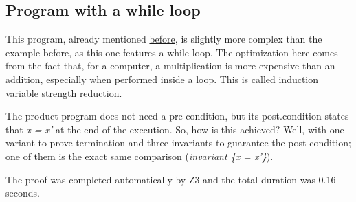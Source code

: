 \FloatBarrier
\subsection{Program with a while loop}
\label{sub:results_while}

This program, already mentioned \hyperref[fig:induction_var_strength_red]{before}, is slightly more complex than the example before, as this one features a while loop.
The optimization here comes from the fact that, for a computer, a multiplication is more expensive than an addition, especially when performed inside a loop.
This is called induction variable strength reduction.

The product program does not need a pre-condition, but its post.condition states that \emph{x = x'} at the end of the execution.
So, how is this achieved?
Well, with one variant to prove termination and three invariants to guarantee the post-condition; one of them is the exact same comparison (\emph{invariant \{x = x'\}}).

The proof was completed automatically by Z3 and the total duration was 0.16 seconds.

